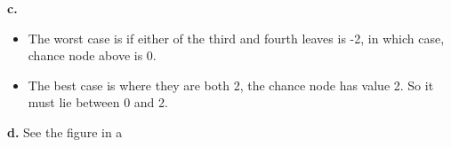 \documentclass[a4paper,left=2.5cm,right=2.5cm,11pt]{article}
\newcommand{\wuhao}{\fontsize{10.5pt}{\baselineskip}\selectfont}    %
\begin{document}
\textbf{c.} 
\begin{itemize}
\item \wuhao The worst case is if either of the third and fourth leaves is -2, in which case, chance node above is 0. 
\item \wuhao The best case is where they are both 2, the chance node has value 2. So it must lie between 0 and 2.
\end{itemize}

\textbf{d.}   See the figure in a





\end{document}
